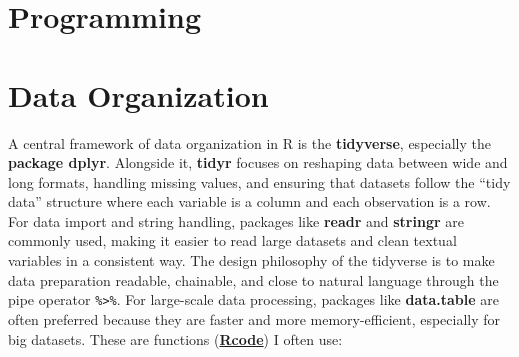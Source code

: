 \documentclass[11pt]{article}
\begin{document}
\section{Programming}

\section{Data Organization}
A central framework of data organization in R is the \textbf{tidyverse}, especially the \textbf{package dplyr}. 
Alongside it, \textbf{tidyr} focuses on reshaping data between wide and long formats, 
handling missing values, and ensuring that datasets follow the ``tidy data'' structure 
where each variable is a column and each observation is a row. For data import and string handling, 
packages like \textbf{readr} and \textbf{stringr} are commonly used, 
making it easier to read large datasets and clean textual variables in a consistent way. 
The design philosophy of the tidyverse is to make data preparation readable, chainable, and close to natural language 
through the pipe operator \texttt{\%\textgreater\%}. 
For large-scale data processing, packages like \textbf{data.table} are often preferred 
because they are faster and more memory-efficient, especially for big datasets.
These are functions (\href{https://github.com/Hiroki-Ando1998/R/tree/main/Data_organization}{\textbf{Rcode}}) I often use:
\end{document}
